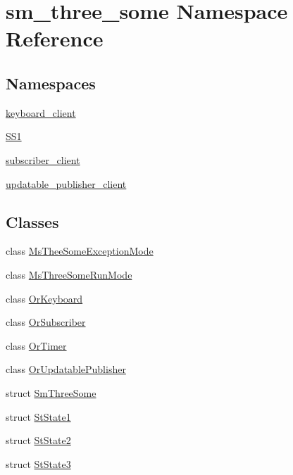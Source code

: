 \hypertarget{namespacesm__three__some}{}\section{sm\+\_\+three\+\_\+some Namespace Reference}
\label{namespacesm__three__some}
\subsection*{Namespaces}
\begin{DoxyCompactItemize}
\item 
 \hyperlink{namespacesm__three__some_1_1keyboard__client}{keyboard\+\_\+client}
\item 
 \hyperlink{namespacesm__three__some_1_1SS1}{S\+S1}
\item 
 \hyperlink{namespacesm__three__some_1_1subscriber__client}{subscriber\+\_\+client}
\item 
 \hyperlink{namespacesm__three__some_1_1updatable__publisher__client}{updatable\+\_\+publisher\+\_\+client}
\end{DoxyCompactItemize}
\subsection*{Classes}
\begin{DoxyCompactItemize}
\item 
class \hyperlink{classsm__three__some_1_1MsTheeSomeExceptionMode}{Ms\+Thee\+Some\+Exception\+Mode}
\item 
class \hyperlink{classsm__three__some_1_1MsThreeSomeRunMode}{Ms\+Three\+Some\+Run\+Mode}
\item 
class \hyperlink{classsm__three__some_1_1OrKeyboard}{Or\+Keyboard}
\item 
class \hyperlink{classsm__three__some_1_1OrSubscriber}{Or\+Subscriber}
\item 
class \hyperlink{classsm__three__some_1_1OrTimer}{Or\+Timer}
\item 
class \hyperlink{classsm__three__some_1_1OrUpdatablePublisher}{Or\+Updatable\+Publisher}
\item 
struct \hyperlink{structsm__three__some_1_1SmThreeSome}{Sm\+Three\+Some}
\item 
struct \hyperlink{structsm__three__some_1_1StState1}{St\+State1}
\item 
struct \hyperlink{structsm__three__some_1_1StState2}{St\+State2}
\item 
struct \hyperlink{structsm__three__some_1_1StState3}{St\+State3}
\end{DoxyCompactItemize}
